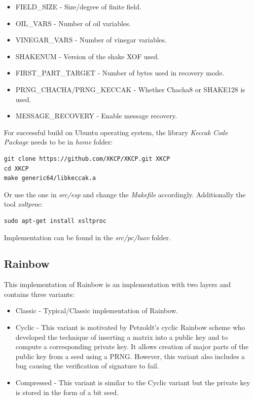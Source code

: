\documentclass[thesis=M,english]{FITthesis}[2019/12/23]
\begin{document}
\begin{itemize}
\item	FIELD\_SIZE - Size/degree of finite field.
\item	OIL\_VARS - Number of oil variables.
\item	VINEGAR\_VARS - Number of vinegar variables.
\item	SHAKENUM - Version of the shake XOF used.
\item	FIRST\_PART\_TARGET - Number of bytes used in recovery mode.
\item	PRNG\_CHACHA/PRNG\_KECCAK - Whether Chacha8 or SHAKE128 is used.
\item	MESSAGE\_RECOVERY - Enable message recovery.
\end{itemize}

For successful build on Ubuntu operating system, the library \textit{Keccak Code Package} needs to be in \textit{home} folder:
\begin{lstlisting}[frame=single]
git clone https://github.com/XKCP/XKCP.git XKCP
cd XKCP
make generic64/libkeccak.a
\end{lstlisting}
Or use the one in \textit{src/esp} and change the \textit{Makefile} accordingly. Additionally the tool \textit{xsltproc}:
\begin{lstlisting}[frame=single]
sudo apt-get install xsltproc
\end{lstlisting}

\bigskip
\noindent
Implementation can be found in the \textit{src/pc/luov} folder.

\subsection{Rainbow}
This implementation of Rainbow is an implementation with two layers and contains three variants:
\begin{itemize}
\item	Classic - Typical/Classic implementation of Rainbow.
\item	Cyclic - This variant is motivated by Petzoldt's cyclic Rainbow scheme\cite{L-RB-CYC} who developed the technique of inserting a matrix into a public key and to compute a corresponding private key. It allows creation of major parts of the public key from a seed using a PRNG. However, this variant also includes a bug causing the verification of signature to fail. 
\item	Compressed - This variant is similar to the Cyclic variant but the private key is stored in the form of a bit seed.
\end{itemize}
\end{document}

